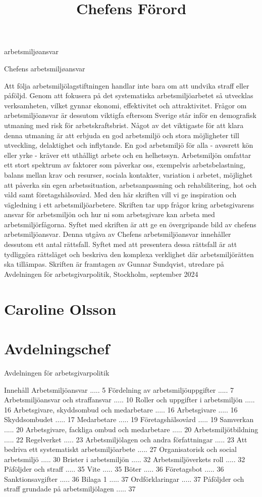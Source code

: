 \title{
Chefens
}
arbetsmiljøansvar

Chefens arbetsmiljøansvar

\title{
Förord
}
Att följa arbetsmiljölagstiftningen handlar inte bara om att undvika straff eller påföljd. Genom att fokusera på det systematiska arbetsmiljöarbetet så utvecklas verksamheten, vilket gynnar ekonomi, effektivitet och attraktivitet. Frågor om arbetsmiljöansvar är dessutom viktigfa eftersom Sverige står inför en demografisk utmaning med risk för arbetskraftsbrist. Något av det viktigaste för att klara denna utmaning är att erbjuda en god arbetsmiljö och stora möjligheter till utveckling, delaktighet och inflytande. En god arbetsmiljö för alla - avøsrett kön eller yrke - kräver ett uthålligt arbete och en helhetssyn.
Arbetsmiljön omfattar ett stort spektrum av faktorer som påverkar oss, exempelvis arbetsbelastning, balans mellan krav och resurser, sociala kontakter, variation i arbetet, möjlighet att påverka sin egen arbetssituation, arbetsanpassning och rehabilitering, hot och våld samt företagshälsovård.
Med den här skriften vill vi ge inspiration och vägledning i ett arbetsmiljöarbetere. Skriften tar upp frågor kring arbetsgivarens ansvar för arbetsmiljön och hur ni som arbetsgivare kan arbeta med arbetsmiljörfågorna. Syftet med skriften är att ge en övergripande bild av chefens arbetsmiljöansvar. Denna utgåva av Chefens arbetsmiljöansvar innehåller dessutom ett antal rättsfall. Syftet med att presentera dessa rättsfall är att tydliggöra rättsläget och beskriva den komplexa verklighet där arbetsmiljörätten ska tillämpas.
Skriften är framtagen av Gunnar Sundqvist, utredare på Avdelningen för arbetsgivarpolitik,
Stockholm, september 2024
\section*{Caroline Olsson}
\section*{Avdelningschef}
Avdelningen för arbetsgivarpolitik

Innehåll
Arbetsmiljöansvar ..... 5
Fördelning av arbetsmiljöuppgifter ..... 7
Arbetsmiljöansvar och straffansvar ..... 10
Roller och uppgifter i arbetsmiljön ..... 16
Arbetsgivare, skyddsombud och medarbetare ..... 16
Arbetsgivare ..... 16
Skyddsombudet ..... 17
Medarbetare ..... 19
Företagshälsovård ..... 19
Samverkan ..... 20
Arbetsgivare, fackliga ombud och medarbetare ..... 20
Arbetsmiljötbildning ..... 22
Regelverket ..... 23
Arbetsmiljölagen och andra författningar ..... 23
Att bedriva ett systematiskt arbetsmiljöarbete ..... 27
Organisatorisk och social arbetsmiljö ..... 30
Brister i arbetsmiljön ..... 32
Arbetsmiljöverkets roll ..... 32
Påföljder och straff ..... 35
Vite ..... 35
Böter ..... 36
Företagsbot ..... 36
Sanktionsavgifter ..... 36
Bilaga 1 ..... 37
Ordförklaringar ..... 37
Påföljder och straff grundade på arbetsmiljölagen ..... 37

